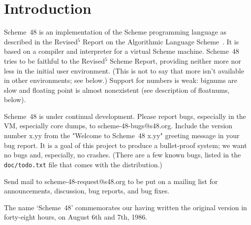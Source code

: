 
\chapter{Introduction}

Scheme~48 is an implementation of the Scheme programming language as
described in the Revised$^5$ Report on the Algorithmic Language
 Scheme~\cite{R5RS}.
It is based on a compiler and interpreter for a virtual Scheme
machine.  Scheme~48 tries to be faithful to the Revised$^5$ Scheme
Report, providing neither more nor less in the initial user
environment.  (This is not to say that more isn't available in other
environments; see below.)  Support for numbers is weak: bignums are
slow and floating point is almost nonexistent (see description of
floatnums, below).

Scheme~48 is under continual development.
Please report bugs, especially in the VM, especially core dumps, to
scheme-48-bugs@s48.org.  Include the version number x.yy
from the "Welcome to Scheme~48 x.yy" greeting message in your bug
report.  It is a goal of this project to produce a bullet-proof
system; we want no bugs and, especially, no crashes.  (There are a few
known bugs, listed in the {\tt doc/todo.txt} file that comes with the
distribution.)

Send mail to scheme-48-request@s48.org to be put on a
mailing list for announcements, discussion, bug reports, and bug
fixes.

The name `Scheme~48' commemorates our having written the original version
 in forty-eight hours, on August 6th and 7th, 1986.

